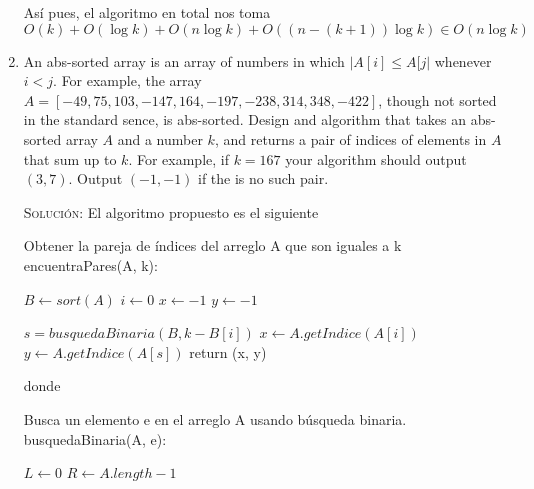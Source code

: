 \documentclass[letterpaper,11pt]{article}
\begin{document}
\begin{enumerate}
    Así pues, el algoritmo en total nos toma 
    \begin{equation*}
        O(k) + O(\log k) + O(n \log k) + O((n - (k + 1)) \log k) \in O(n \log k)
    \end{equation*}

    \item An abs-sorted array is an array of numbers in which $|A[i] \leq A[j|$
    whenever $i < j$. For example, the array $A = [-49, 75, 103, -147, 164, -197,
    -238, 314, 348, -422]$, though not sorted in the standard sence, is 
    abs-sorted. Design and algorithm that takes an abs-sorted array $A$ and a 
    number $k$, and returns a pair of indices of elements in $A$ that sum up to 
    $k$. For example, if $k = 167$ your algorithm should output $(3, 7)$. Output 
    $(-1, -1)$ if the is no such pair.

    \textsc{Solución:} El algoritmo propuesto es el siguiente 
    \begin{center}
        \begin{minipage}[c]{0.75\textwidth}
        \begin{algorithm}[H]
            \caption{Obtener la pareja de índices del arreglo A que son iguales 
                     a k \\ encuentraPares(A, k):} 
            \begin{algorithmic}[1]
                \State $B \gets sort(A)$
                \State $i \gets 0$
                \State $x \gets -1$
                \State $y \gets -1$

                    \State $s = busquedaBinaria(B, k-B[i])$
                        \State $x \gets A.getIndice(A[i])$
                        \State $y \gets A.getIndice(A[s])$
                        \State return (x, y)
                    \EndIf
                \EndWhile
                
            \end{algorithmic} 
        \end{algorithm}
        \end{minipage}
    \end{center}

    \newpage
    donde 
    \begin{center}
        \begin{minipage}[c]{0.75\textwidth}
        \begin{algorithm}[H]
            \caption{Busca un elemento e en el arreglo A usando búsqueda binaria. 
                     \\ busquedaBinaria(A, e):} 
            \begin{algorithmic}[1]
                \State $L \gets 0$
                \State $R \gets A.length - 1$
    

\end{algorithmic}
\end{algorithm}
\end{minipage}
\end{center}
\end{enumerate}
\end{document}
